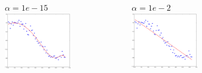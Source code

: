 \documentclass[handout, 10pt]{beamer}
\begin{document}
\begin{frame}
\begin{columns}
\begin{figure}
\end{figure}
\vspace{-2em}
\begin{figure}
$\alpha=1e-15$
\includegraphics[width=0.99\textwidth]{./lasso_alpha1e-15.png}
\end{figure}
\vspace{-2em}
\begin{figure}
$\alpha=1e-2$
\includegraphics[width=0.99\textwidth]{./lasso_alpha1e-2.png}
\end{figure}

\end{columns}
\end{frame}
\end{document}
